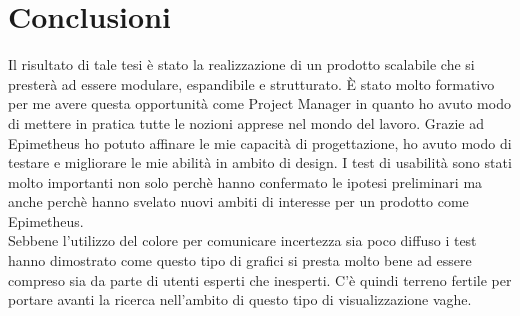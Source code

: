 \chapter{Conclusioni}
\label{cap:conclusioni}

Il risultato di tale tesi è stato la realizzazione di un prodotto scalabile che si presterà ad essere modulare, espandibile e strutturato. È stato molto formativo per me avere questa opportunità come Project Manager in quanto ho avuto modo di mettere in pratica tutte le nozioni apprese nel mondo del lavoro. Grazie ad Epimetheus ho potuto affinare le mie capacità di progettazione, ho avuto modo di testare e migliorare le mie abilità in ambito di design. I test di usabilità sono stati molto importanti non solo perchè hanno confermato le ipotesi preliminari ma anche perchè hanno svelato nuovi ambiti di interesse per un prodotto come Epimetheus. \\
Sebbene l'utilizzo del colore per comunicare incertezza sia poco diffuso i test hanno dimostrato come questo tipo di grafici si presta molto bene ad essere compreso sia da parte di utenti esperti che inesperti. C'è quindi terreno fertile per portare avanti la ricerca nell'ambito di questo tipo di visualizzazione vaghe. 

